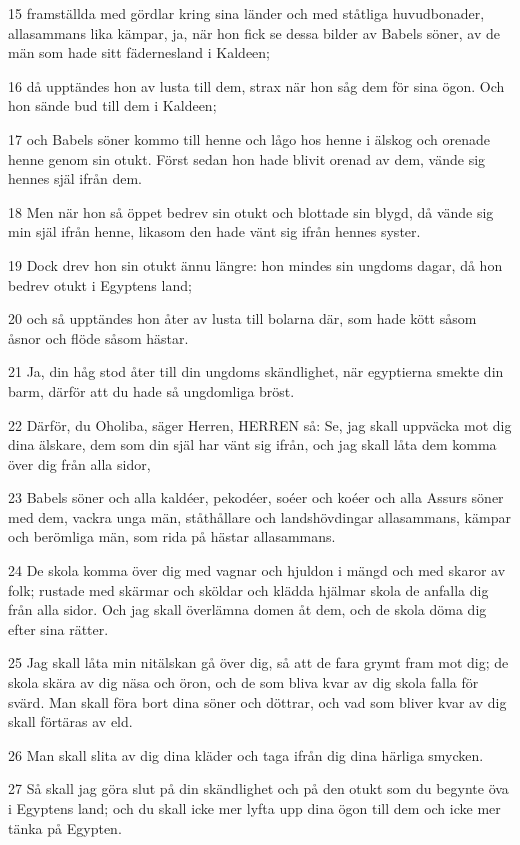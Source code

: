 \par 15 framställda med gördlar kring sina länder och med ståtliga huvudbonader, allasammans lika kämpar, ja, när hon fick se dessa bilder av Babels söner, av de män som hade sitt fädernesland i Kaldeen;
\par 16 då upptändes hon av lusta till dem, strax när hon såg dem för sina ögon. Och hon sände bud till dem i Kaldeen;
\par 17 och Babels söner kommo till henne och lågo hos henne i älskog och orenade henne genom sin otukt. Först sedan hon hade blivit orenad av dem, vände sig hennes själ ifrån dem.
\par 18 Men när hon så öppet bedrev sin otukt och blottade sin blygd, då vände sig min själ ifrån henne, likasom den hade vänt sig ifrån hennes syster.
\par 19 Dock drev hon sin otukt ännu längre: hon mindes sin ungdoms dagar, då hon bedrev otukt i Egyptens land;
\par 20 och så upptändes hon åter av lusta till bolarna där, som hade kött såsom åsnor och flöde såsom hästar.
\par 21 Ja, din håg stod åter till din ungdoms skändlighet, när egyptierna smekte din barm, därför att du hade så ungdomliga bröst.
\par 22 Därför, du Oholiba, säger Herren, HERREN så: Se, jag skall uppväcka mot dig dina älskare, dem som din själ har vänt sig ifrån, och jag skall låta dem komma över dig från alla sidor,
\par 23 Babels söner och alla kaldéer, pekodéer, soéer och koéer och alla Assurs söner med dem, vackra unga män, ståthållare och landshövdingar allasammans, kämpar och berömliga män, som rida på hästar allasammans.
\par 24 De skola komma över dig med vagnar och hjuldon i mängd och med skaror av folk; rustade med skärmar och sköldar och klädda hjälmar skola de anfalla dig från alla sidor. Och jag skall överlämna domen åt dem, och de skola döma dig efter sina rätter.
\par 25 Jag skall låta min nitälskan gå över dig, så att de fara grymt fram mot dig; de skola skära av dig näsa och öron, och de som bliva kvar av dig skola falla för svärd. Man skall föra bort dina söner och döttrar, och vad som bliver kvar av dig skall förtäras av eld.
\par 26 Man skall slita av dig dina kläder och taga ifrån dig dina härliga smycken.
\par 27 Så skall jag göra slut på din skändlighet och på den otukt som du begynte öva i Egyptens land; och du skall icke mer lyfta upp dina ögon till dem och icke mer tänka på Egypten.
